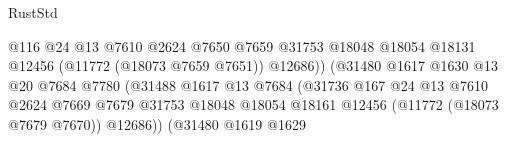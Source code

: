 \begin{lexlean}{RustStd}
\begin{coremodule}
                                                      @116
                                                      @24
                                                      @13
                                                      @7610
                                                      @2624
                                                      @7650
                                                      @7659
                                                      @31753
                                                      @18048
                                                      @18054
                                                      @18131
                                                      @12456
                                                      (@11772 (@18073 @7659 @7651))
                                                      @12686))
                                                  (@31480
                                                    @1617
                                                    @1630
                                                    @13
                                                    @20
                                                    @7684
                                                    @7780
                                                    (@31488
                                                      @1617
                                                      @13
                                                      @7684
                                                      (@31736
                                                        @167
                                                        @24
                                                        @13
                                                        @7610
                                                        @2624
                                                        @7669
                                                        @7679
                                                        @31753
                                                        @18048
                                                        @18054
                                                        @18161
                                                        @12456
                                                        (@11772 (@18073 @7679 @7670))
                                                        @12686))
                                                    (@31480
                                                      @1619
                                                      @1629

\end{coremodule}
\end{lexlean}
